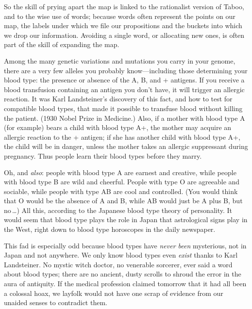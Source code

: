 {{{
 So the skill of prying apart the map is linked to the rationalist
version of Taboo, and to the wise use of words; because words often
represent the points on our map, the labels under which we file our
propositions and the buckets into which we drop our information.
Avoiding a single word, or allocating new ones, is often part of the
skill of expanding the map.}

\myendsectiontext


{
 Among the many genetic variations and mutations you carry in your
genome, there are a very few alleles you probably know---including
those determining your blood type: the presence or absence of the A, B,
and + antigens. If you receive a blood transfusion containing an
antigen you don't have, it will trigger an allergic
reaction. It was Karl Landsteiner's discovery of this
fact, and how to test for compatible blood types, that made it possible
to transfuse blood without killing the patient. (1930 Nobel Prize in
Medicine.) Also, if a mother with blood type A (for example) bears a
child with blood type A+, the mother may acquire an allergic reaction
to the + antigen; if she has another child with blood type A+, the
child will be in danger, unless the mother takes an allergic
suppressant during pregnancy. Thus people learn their blood types
before they marry. }

{
 Oh, and \textit{also}: people with blood type A are earnest and
creative, while people with blood type B are wild and cheerful. People
with type O are agreeable and sociable, while people with type AB are
cool and controlled. (You would think that O would be the absence of A
and B, while AB would just be A plus B, but no\,\ldots) All this,
according to the Japanese blood type theory of personality. It would
seem that blood type plays the role in Japan that astrological signs
play in the West, right down to blood type horoscopes in the daily
newspaper.}

{
 This fad is especially odd because blood types have \textit{never
been} mysterious, not in Japan and not anywhere. We only know blood
types even \textit{exist} thanks to Karl Landsteiner. No mystic witch
doctor, no venerable sorcerer, ever said a word about blood types;
there are no ancient, dusty scrolls to shroud the error in the aura of
antiquity. If the medical profession claimed tomorrow that it had all
been a colossal hoax, we layfolk would not have one scrap of evidence
from our unaided senses to contradict them.}

}}
